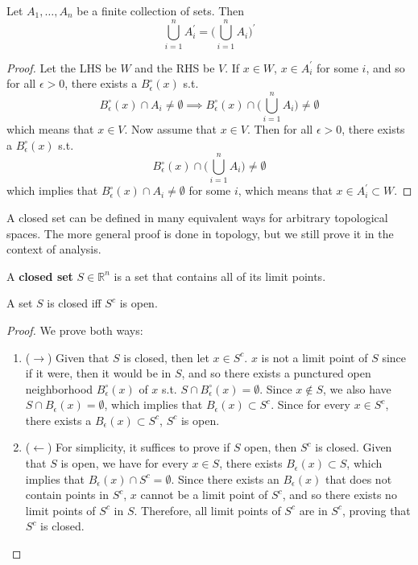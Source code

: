     \begin{theorem}
      Let $A_1, \ldots, A_n$ be a finite collection of sets. Then 
      \[\bigcup_{i=1}^n A_i^\prime = \bigg( \bigcup_{i=1}^n A_i \bigg)^\prime\]
    \end{theorem}
    \begin{proof}
      Let the LHS be $W$ and the RHS be $V$. If $x \in W$, $x \in A_i^\prime$ for some $i$, and so for all $\epsilon > 0$, there exists a $B_\epsilon^\circ (x)$ s.t. 
      \[B_\epsilon^\circ (x) \cap A_i \neq \emptyset \implies B_\epsilon^\circ (x) \cap \bigg( \bigcup_{i=1}^n A_i \bigg) \neq \emptyset\]
      which means that $x \in V$. Now assume that $x \in V$. Then for all $\epsilon > 0$, there exists a $B_\epsilon^\circ (x)$ s.t. 
      \[B_\epsilon^\circ (x) \cap \bigg( \bigcup_{i=1}^n A_i \bigg) \neq \emptyset\]
      which implies that $B_\epsilon^\circ (x) \cap A_i \neq \emptyset$ for some $i$, which means that $x \in A_i^\prime \subset W$. 
    \end{proof}

    A closed set can be defined in many equivalent ways for arbitrary topological spaces. The more general proof is done in topology, but we still prove it in the context of analysis. 

    \begin{definition}
      A \textbf{closed set} $S \in \mathbb{R}^n$ is a set that contains all of its limit points. 
    \end{definition}

    \begin{theorem}
      A set $S$ is closed iff $S^c$ is open. 
    \end{theorem}
    \begin{proof}
      We prove both ways: 
      \begin{enumerate}
        \item ($\rightarrow$) Given that $S$ is closed, then let $x \in S^c$. $x$ is not a limit point of $S$ since if it were, then it would be in $S$, and so there exists a punctured open neighborhood $B_\epsilon^\circ (x)$ of $x$ s.t. $S \cap B_\epsilon^\circ (x) = \emptyset$. Since $x \not\in S$, we also have $S \cap B_\epsilon (x) = \emptyset$, which implies that $B_\epsilon (x) \subset S^c$. Since for every $x \in S^c$, there exists a $B_\epsilon (x) \subset S^c$, $S^c$ is open. 

        \item ($\leftarrow$) For simplicity, it suffices to prove if $S$ open, then $S^c$ is closed. Given that $S$ is open, we have for every $x \in S$, there exists $B_\epsilon (x) \subset S$, which implies that $B_\epsilon (x) \cap S^c = \emptyset$. Since there exists an $B_\epsilon (x)$ that does not contain points in $S^c$, $x$ cannot be a limit point of $S^c$, and so there exists no limit points of $S^c$ in $S$. Therefore, all limit points of $S^c$ are in $S^c$, proving that $S^c$ is closed.  
      \end{enumerate}
    \end{proof}

